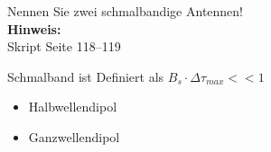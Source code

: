 \begin{question}[section=11,name={Schmalbandantennen},difficulty=,quantity=4,type=thr,tags={20130513,20061016}]
	Nennen Sie zwei schmalbandige Antennen!
	\\ \textbf{Hinweis:}\\
	Skript Seite 118--119
\end{question}
\begin{solution}
	Schmalband ist Definiert als $B_s \cdot \Delta \tau_{max} <<1$
	\begin{itemize}
		\item{Halbwellendipol}
		\item{Ganzwellendipol}
	\end{itemize}
\end{solution}
